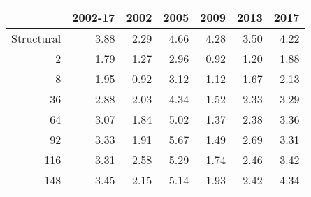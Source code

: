 \begin{table}[ht]
\centering
\begin{tabular}{rrrrrrr}
  \hline
 & 2002-17 & 2002 & 2005 & 2009 & 2013 & 2017 \\ 
  \hline
Structural & 3.88 & 2.29 & 4.66 & 4.28 & 3.50 & 4.22 \\ 
  2 & 1.79 & 1.27 & 2.96 & 0.92 & 1.20 & 1.88 \\ 
  8 & 1.95 & 0.92 & 3.12 & 1.12 & 1.67 & 2.13 \\ 
  36 & 2.88 & 2.03 & 4.34 & 1.52 & 2.33 & 3.29 \\ 
  64 & 3.07 & 1.84 & 5.02 & 1.37 & 2.38 & 3.36 \\ 
  92 & 3.33 & 1.91 & 5.67 & 1.49 & 2.69 & 3.31 \\ 
  116 & 3.31 & 2.58 & 5.29 & 1.74 & 2.46 & 3.42 \\ 
  148 & 3.45 & 2.15 & 5.14 & 1.93 & 2.42 & 4.34 \\ 
   \hline
\end{tabular}
\end{table}
